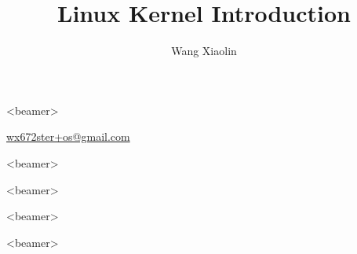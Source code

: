 





\begin{frame}<beamer>
  \title{Linux Kernel Introduction}
  \author{Wang Xiaolin}
  \titlepage
  \vfill
  {\small{} \url{wx672ster+os@gmail.com} }
\end{frame}


\begin{frame}<beamer>
  \begin{refsection}
    \nocite{tanenbaum2008modern, silberschatz11essentials, zouhengming09}
    \printbibliography[prenote=osbooks,heading=none]
  \end{refsection}
\end{frame}

\begin{frame}<beamer>
  \begin{refsection}
    \nocite{corbet05ldd, bovet2005understanding, mauerer2008professional,
      love2010linux, rodriguez2005linux}
    \printbibliography[prenote=kernel,heading=none]
  \end{refsection}
\end{frame}

\begin{frame}<beamer>
  \begin{refsection}
    \nocite{bartlett2009programming, carter06:_pc_assem_languag, x86assemblymanual,
      wikibooks-gas, howto:gcc-inline-asm, x86-inline-asm-linux, stack:gcc-gen-asm}
    \printbibliography[prenote=asm,heading=none]
  \end{refsection}
\end{frame}

\begin{frame}<beamer>
  \begin{refsection}
    \nocite{Kroah-Hartman:1053063, yuyuan2009orange, zhenggang2016}
    \printbibliography[prenote=lab,heading=none]
  \end{refsection}
\end{frame}

